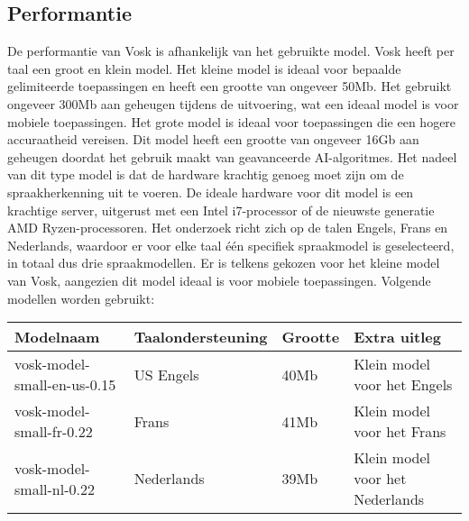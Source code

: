 \subsection{Performantie}
De performantie van Vosk is afhankelijk van het gebruikte model. Vosk heeft per taal een groot en klein model. Het kleine model is ideaal voor bepaalde gelimiteerde toepassingen en heeft een grootte van ongeveer 50Mb. Het gebruikt ongeveer 300Mb aan geheugen tijdens de uitvoering, wat een ideaal model is voor mobiele toepassingen. Het grote model is ideaal voor toepassingen die een hogere accuraatheid vereisen. Dit model heeft een grootte van ongeveer 16Gb aan geheugen doordat het gebruik maakt van geavanceerde AI-algoritmes. Het nadeel van dit type model is dat de hardware krachtig genoeg moet zijn om de spraakherkenning uit te voeren. De ideale hardware voor dit model is een krachtige server, uitgerust met een Intel i7-processor of de nieuwste generatie AMD Ryzen-processoren. Het onderzoek richt zich op de talen Engels, Frans en Nederlands, waardoor er voor elke taal één specifiek spraakmodel is geselecteerd, in totaal dus drie spraakmodellen. Er is telkens gekozen voor het kleine model van Vosk, aangezien dit model ideaal is voor mobiele toepassingen. 
Volgende modellen worden gebruikt:

\begin{center}
  \begin{tabular}{ | l | l | l | p{5cm} |}
  \hline
  Modelnaam & Taalondersteuning & Grootte & Extra uitleg \\ \hline
  vosk-model-small-en-us-0.15 & US Engels & 40Mb & Klein model voor het Engels \\ \hline
  vosk-model-small-fr-0.22 & Frans & 41Mb & Klein model voor het Frans \\ \hline
  vosk-model-small-nl-0.22 & Nederlands & 39Mb & Klein model voor het Nederlands \\ \hline
  \end{tabular}
\end{center}

